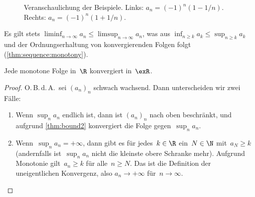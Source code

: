 \documentclass[a4paper]{article}
\begin{document}
\begin{example}
\begin{enumerate}
              \begin{figure}
                  \hspace*{1cm}
                  \caption{Veranschaulichung der Beispiele. Links: $a_n = (-1)^n(1-1/n)$. Rechts: $a_n = (-1)^n (1+1/n)$.}
              \end{figure}
    \end{enumerate}
\end{example}

\begin{remark}
    Es gilt stets $\liminf_{n\to\infty} a_n \leq \limsup_{n\to\infty} a_n$, was aus $\inf_{n\geq k} a_k \leq \sup_{n\geq k} a_k$ und der Ordnungserhaltung von konvergierenden Folgen folgt (\cref{thm:sequence:monotony}).
\end{remark}


\begin{theorem}\label{thm:convergence:exr}
    Jede monotone Folge in~$\R$ konvergiert in~$\exR$.
\end{theorem}

\begin{proof}
    O.\,B.\,d.\,A.\ sei $(a_n)_n$ schwach wachsend. Dann unterscheiden wir zwei Fälle:
    \begin{enumerate}
        \item Wenn $\sup_n a_n$ endlich ist, dann ist $(a_n)_n$ nach oben beschränkt, und aufgrund \cref{thm:bound2} konvergiert die Folge gegen~$\sup_n a_n$.
        \item Wenn~$\sup_n a_n = +\infty$, dann gibt es für jedes~$k \in \R$ ein~$N \in \N$ mit~$a_N \geq k$ (andernfalls ist~$\sup_n a_n$ nicht die kleinste obere Schranke mehr). Aufgrund Monotonie gilt~$a_n \geq k$ für alle~$n \geq N$. Das ist die Definition der uneigentlichen Konvergenz, also $a_n \to +\infty$ für~$n \to \infty$.\qedhere
    \end{enumerate}
\end{proof}
\end{document}
